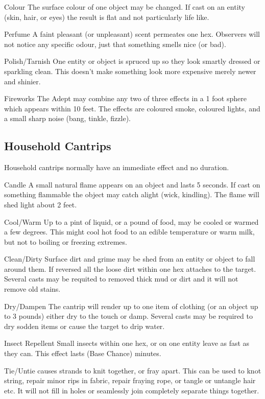 \begin{multicols*}{3}
\begin{Description}
\item[Colour] The surface colour of one object may be changed. If cast
on an entity (\eg skin, hair, or eyes) the result is flat and not
particularly life like.

\item[Perfume] A faint pleasant (or unpleasant) scent permeates one
hex. Observers will not notice any specific odour, just that something
smells nice (or bad).

\item[Polish/Tarnish] One entity or object is spruced up so they look
smartly dressed or sparkling clean.  This doesn't make something look
more expensive merely newer and shinier.

\item[Fireworks] The Adept may combine any two of three effects in a 1
foot sphere which appears within 10 feet.  The effects are coloured
smoke, coloured lights, and a small sharp noise (\eg bang, tinkle,
fizzle).
\end{Description}

\subsection{Household Cantrips}

Household cantrips normally have an immediate effect and no duration.
\begin{Description}
\item[Candle] A small natural flame appears on an object and lasts 5
seconds.  If cast on something flammable the object may catch alight
(\eg wick, kindling).  The flame will shed light about 2 feet.

\item[Cool/Warm] Up to a pint of liquid, or a pound of food, may be
cooled or warmed a few degrees. This might cool hot food to an edible
temperature or warm milk, but not to boiling or freezing extremes.

\item[Clean/Dirty] Surface dirt and grime may be shed from an entity
or object to fall around them. If reversed all the loose dirt within
one hex attaches to the target.  Several casts may be requited to
removed thick mud or dirt and it will not remove old stains.

\item[Dry/Dampen] The cantrip will render up to one item of clothing
(or an object up to 3 pounds) either dry to the touch or damp. Several
casts may be required to dry sodden items or cause the target to drip
water.

\item[Insect Repellent] Small insects within one hex, or on one entity
leave as fast as they can. This effect lasts (Base Chance) minutes.

\item[Tie/Untie] causes strands to knit together, or fray apart.  This
can be used to knot string, repair minor rips in fabric, repair
fraying rope, or tangle or untangle hair etc.  It will not fill in
holes or seamlessly join completely separate things together.
\end{Description}
\end{multicols*}

